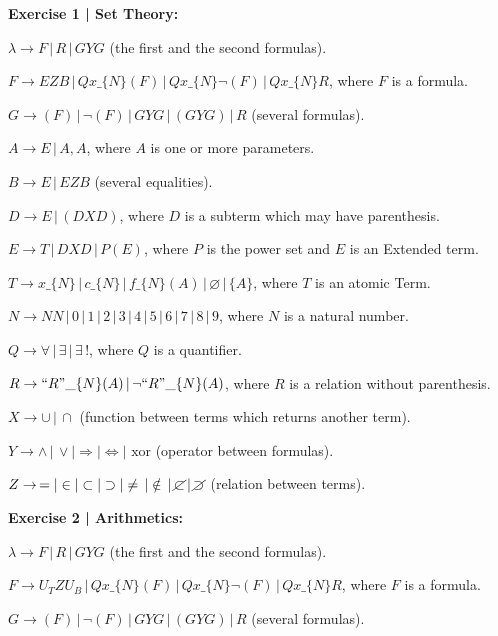 \documentclass[11pt,a4paper]{article}
\begin{document}
		\vspace{120mm}
		\Large
		\textbf{Exercise 1 | Set Theory:}
		\small
		\vspace{3mm}

		$\lambda \rightarrow F \,|\,R\,|\,GYG$ (the first and the second formulas).

		$F \rightarrow EZB\,|\, Q x\_\{N\} (F)\,|\, Q x\_\{N\} \neg(F)\,|\, Q x\_\{N\} R$, where $F$ is a formula.

		$G \rightarrow (F)\,|\,\neg(F)\,|\, GYG \,|\, (GYG)\,|\,R$ (several formulas).

		$A \rightarrow E\,|\, A, A$, where $A$ is one or more parameters.

		$B \rightarrow E\,|\,EZB$ (several equalities).

		$D \rightarrow E\,|\,(DXD)$, where $D$ is a subterm which may have parenthesis.

		$E \rightarrow T\,|\, DXD\,|\,P(E)$, where $P$ is the power set and $E$ is an Extended term.

		$T \rightarrow x\_\{N\} \,|\, c\_\{N\} \,|\, f\_\{N\}(A) \,|\, \varnothing \,|\, \{ A \}$, where $T$ is an atomic Term.

		$N \rightarrow NN \,|\, 0\,|\,1\,|\,2\,|\,3\,|\,4\,|\,5\,|\,6\,|\,7\,|\,8\,|\,9$, where $N$ is a natural number.

		$Q \rightarrow \forall\,|\,\exists\,|\,\exists\,!$, where $Q$ is a quantifier.

		$R \rightarrow ``R"\_\{N\}(A) \,|\, \neg ``R"\_\{N\}(A)$, where $R$ is a relation without parenthesis.

		$X \rightarrow \cup\,|\,\cap$ (function between terms which returns another term).

		$Y \rightarrow \wedge\,|\,\vee|\Rightarrow|\Leftrightarrow|\text{ xor}$ (operator between formulas).

		$Z \rightarrow\, =|\in|\subset|\supset|\ne\,|\notin\,|\,\cancel{\subset}\,|\,\cancel{\supset}$ (relation between terms).

		\vspace{3mm}
		\Large
		\textbf{Exercise 2 | Arithmetics:}
		\small
		\vspace{3mm}

		$\lambda \rightarrow F \,|\,R\,|\,GYG$ (the first and the second formulas).

		$F \rightarrow U_TZU_B\,|\, Q x\_\{N\} (F)\,|\, Q x\_\{N\} \neg(F)\,|\, Q x\_\{N\} R$, where $F$ is a formula.

		$G \rightarrow (F)\,|\,\neg(F)\,|\, GYG \,|\, (GYG)\,|\,R$ (several formulas).
\end{document}
